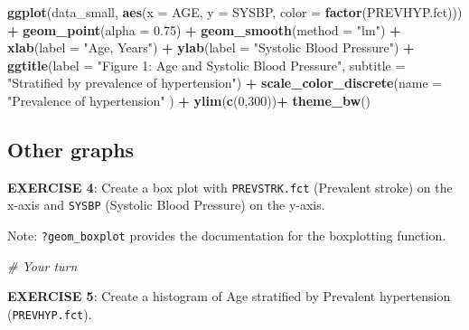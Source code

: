 \documentclass[
]{article}
\newenvironment{Shaded}{\begin{snugshade}}{\end{snugshade}}
\newcommand{\CommentTok}[1]{\textcolor[rgb]{0.56,0.35,0.01}{\textit{#1}}}
\newcommand{\DataTypeTok}[1]{\textcolor[rgb]{0.13,0.29,0.53}{#1}}
\newcommand{\DecValTok}[1]{\textcolor[rgb]{0.00,0.00,0.81}{#1}}
\newcommand{\FloatTok}[1]{\textcolor[rgb]{0.00,0.00,0.81}{#1}}
\newcommand{\KeywordTok}[1]{\textcolor[rgb]{0.13,0.29,0.53}{\textbf{#1}}}
\newcommand{\NormalTok}[1]{#1}
\newcommand{\OperatorTok}[1]{\textcolor[rgb]{0.81,0.36,0.00}{\textbf{#1}}}
\newcommand{\StringTok}[1]{\textcolor[rgb]{0.31,0.60,0.02}{#1}}
\begin{document}
\begin{Shaded}
\begin{Highlighting}[]
\KeywordTok{ggplot}\NormalTok{(data_small, }
      \KeywordTok{aes}\NormalTok{(}\DataTypeTok{x =}\NormalTok{ AGE, }\DataTypeTok{y =}\NormalTok{ SYSBP, }\DataTypeTok{color =} \KeywordTok{factor}\NormalTok{(PREVHYP.fct))) }\OperatorTok{+}
\StringTok{  }\KeywordTok{geom_point}\NormalTok{(}\DataTypeTok{alpha =} \FloatTok{0.75}\NormalTok{) }\OperatorTok{+}
\StringTok{  }\KeywordTok{geom_smooth}\NormalTok{(}\DataTypeTok{method =} \StringTok{"lm"}\NormalTok{) }\OperatorTok{+}
\StringTok{  }\KeywordTok{xlab}\NormalTok{(}\DataTypeTok{label =} \StringTok{"Age, Years"}\NormalTok{) }\OperatorTok{+}\StringTok{ }
\StringTok{  }\KeywordTok{ylab}\NormalTok{(}\DataTypeTok{label =} \StringTok{"Systolic Blood Pressure"}\NormalTok{) }\OperatorTok{+}
\StringTok{  }\KeywordTok{ggtitle}\NormalTok{(}\DataTypeTok{label =} \StringTok{"Figure 1: Age and Systolic Blood Pressure"}\NormalTok{, }
          \DataTypeTok{subtitle =} \StringTok{"Stratified by prevalence of hypertension"}\NormalTok{) }\OperatorTok{+}\StringTok{ }
\StringTok{  }\KeywordTok{scale_color_discrete}\NormalTok{(}\DataTypeTok{name =} \StringTok{"Prevalence of hypertension"}\NormalTok{ ) }\OperatorTok{+}\StringTok{ }
\StringTok{  }\KeywordTok{ylim}\NormalTok{(}\KeywordTok{c}\NormalTok{(}\DecValTok{0}\NormalTok{,}\DecValTok{300}\NormalTok{))}\OperatorTok{+}
\StringTok{  }\KeywordTok{theme_bw}\NormalTok{()}
\end{Highlighting}
\end{Shaded}

\hypertarget{other-graphs}{%
\subsection{Other graphs}\label{other-graphs}}

\textbf{EXERCISE 4}: Create a box plot with \texttt{PREVSTRK.fct}
(Prevalent stroke) on the x-axis and \texttt{SYSBP} (Systolic Blood
Pressure) on the y-axis.

Note: \texttt{?geom\_boxplot} provides the documentation for the
boxplotting function.

\begin{Shaded}
\begin{Highlighting}[]
\CommentTok{# Your turn}
\end{Highlighting}
\end{Shaded}

\textbf{EXERCISE 5}: Create a histogram of Age stratified by Prevalent
hypertension (\texttt{PREVHYP.fct}).
\end{document}
